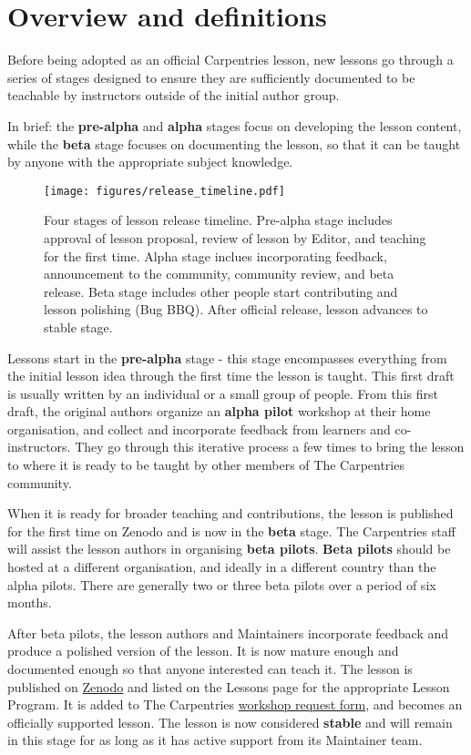 \documentclass[
]{book}
\begin{document}
\hypertarget{overview-and-definitions}{%
\section{Overview and definitions}\label{overview-and-definitions}}

Before being adopted as an official Carpentries lesson,
new lessons go through a series of stages designed to
ensure they are sufficiently documented to be teachable
by instructors outside of the initial author group.

In brief: the \textbf{pre-alpha} and \textbf{alpha} stages focus on
developing the lesson content, while the \textbf{beta} stage
focuses on documenting the lesson, so that it can be
taught by anyone with the appropriate subject knowledge.

\begin{figure}
\centering
\texttt{[image: figures/release\_timeline.pdf]}
\caption{\label{fig:release-timeline}Four stages of lesson release timeline. Pre-alpha stage includes approval of lesson proposal, review of lesson by Editor, and teaching for the first time. Alpha stage inclues incorporating feedback, announcement to the community, community review, and beta release. Beta stage includes other people start contributing and lesson polishing (Bug BBQ). After official release, lesson advances to stable stage.}
\end{figure}

Lessons start in the \textbf{pre-alpha} stage - this stage
encompasses everything from the initial lesson idea
through the first time the lesson is taught. This
first draft is usually written by an individual
or a small group of people. From this first draft, the
original authors organize an \textbf{alpha pilot} workshop at
their home organisation, and collect and incorporate
feedback from learners and co-instructors. They go
through this iterative process a few times to bring the
lesson to where it is ready to be taught by other
members of The Carpentries community.

When it is ready for broader teaching and contributions,
the lesson is published for
the first time on Zenodo and is now in the \textbf{beta}
stage. The Carpentries staff will assist the lesson
authors in organising \textbf{beta pilots}.
\textbf{Beta pilots}
should be hosted at a different organisation, and
ideally in a different country than the alpha pilots.
There are generally two or three beta pilots over a
period of six months.

After beta pilots, the lesson authors and Maintainers
incorporate feedback and produce a polished version of
the lesson. It is now mature enough and
documented enough so that anyone interested can teach it. The lesson is published on \href{https://zenodo.org/communities/carpentries/?page=1\&size=20}{Zenodo} and listed on the
Lessons page for the appropriate
Lesson Program. It is added to The Carpentries
\href{http://carpentries.org/request-workshop}{workshop request form}, and becomes an officially
supported lesson. The lesson is now considered \textbf{stable} and will remain in this stage for as long
as it has active support from its Maintainer team.
\end{document}
